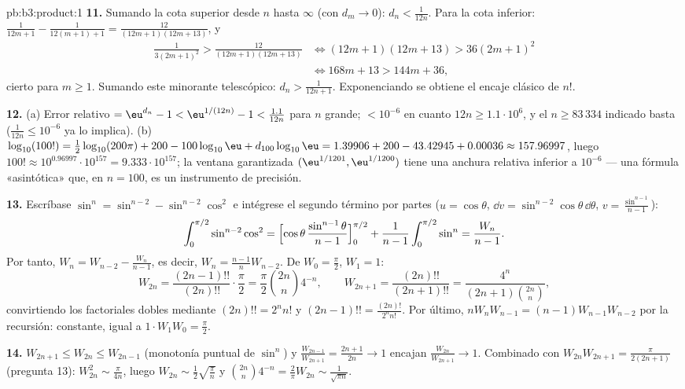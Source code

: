 \begin{solution}{pb:b3:product:1}
\textbf{11.} Sumando la cota superior desde $n$ hasta $\infty$ (con
$d_m \to 0$): $d_n < \frac1{12n}$. Para la cota inferior:
$\frac1{12m+1} - \frac1{12(m+1)+1} =
\frac{12}{(12m+1)(12m+13)}$, y
\begin{align*}
\frac1{3(2m+1)^2} > \frac{12}{(12m+1)(12m+13)}
&\iff (12m+1)(12m+13) > 36(2m+1)^2 \\
&\iff 168m + 13 > 144m + 36,
\end{align*}
cierto para $m \geq 1$. Sumando este minorante telescópico:
$d_n > \frac1{12n+1}$. Exponenciando se obtiene el encaje clásico de
$n!$.

\textbf{12.} (a) Error relativo $= \eu^{d_n} - 1 <
\eu^{1/(12n)} - 1 < \frac{1.1}{12n}$ para $n$ grande; $<
10^{-6}$ en cuanto $12n \geq 1.1\cdot10^6$, y el $n \geq 83\,334$
indicado basta ($\frac1{12n} \leq 10^{-6}$ ya lo implica). (b)
$\log_{10}(100!) =
\frac12\log_{10}(200\pi) + 200 - 100\log_{10}\eu +
d_{100}\log_{10}\eu = 1.39906 + 200 - 43.42945 + 0.00036
\approx 157.96997$, luego $100! \approx 10^{0.96997} \cdot
10^{157} = 9.333\cdot10^{157}$; la ventana garantizada
$(\eu^{1/1201}, \eu^{1/1200})$ tiene una anchura relativa inferior a
$10^{-6}$ --- una fórmula «asintótica» que, en $n =
100$, es un instrumento de precisión.

\textbf{13.} Escríbase $\sin^n = \sin^{n-2} - \sin^{n-2}\cos^2$ e
intégrese el segundo término por partes ($u = \cos\theta$,
$\dd v = \sin^{n-2}\cos\theta\,\dd\theta$, $v =
\frac{\sin^{n-1}}{n-1}$):
\[
\int_0^{\pi/2}\sin^{n-2}\cos^2 =
\Bigl[\cos\theta\,\frac{\sin^{n-1}\theta}{n-1}\Bigr]_0^{\pi/2}
+ \frac1{n-1}\int_0^{\pi/2}\sin^n = \frac{W_n}{n-1} .
\]
Por tanto, $W_n = W_{n-2} - \frac{W_n}{n-1}$, es decir, $W_n =
\frac{n-1}nW_{n-2}$. De $W_0 = \frac\pi2$, $W_1 = 1$:
\[
W_{2n} = \frac{(2n-1)!!}{(2n)!!}\cdot\frac\pi2
= \frac\pi2\binom{2n}n4^{-n},
\qquad
W_{2n+1} = \frac{(2n)!!}{(2n+1)!!}
= \frac{4^n}{(2n+1)\binom{2n}n},
\]
convirtiendo los factoriales dobles mediante $(2n)!! = 2^nn!$ y
$(2n-1)!! = \frac{(2n)!}{2^nn!}$. Por último, $nW_nW_{n-1} =
(n-1)W_{n-1}W_{n-2}$ por la recursión: constante, igual a
$1\cdot W_1W_0 = \frac\pi2$.

\textbf{14.} $W_{2n+1} \leq W_{2n} \leq W_{2n-1}$ (monotonía puntual de
$\sin^n$) y $\frac{W_{2n-1}}{W_{2n+1}} =
\frac{2n+1}{2n} \to 1$ encajan $\frac{W_{2n}}{W_{2n+1}} \to
1$. Combinado con $W_{2n}W_{2n+1} = \frac{\pi}{2(2n+1)}$ (pregunta 13):
$W_{2n}^2 \sim \frac\pi{4n}$, luego $W_{2n} \sim
\frac12\sqrt{\frac\pi n}$ y $\binom{2n}n4^{-n} =
\frac2\pi W_{2n} \sim \frac1{\sqrt{\pi n}}$.


\end{solution}
